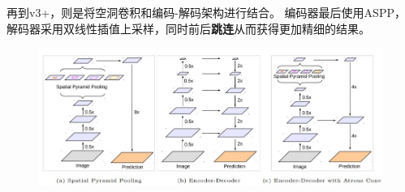 再到v3+\cite{chen:deeplabv3p_2018}，则是将空洞卷积和编码-解码架构进行结合。
编码器最后使用ASPP，解码器采用双线性插值上采样，同时前后\textbf{跳连}从而获得更加精细的结果。
\begin{figure}[H]
\centering
\includegraphics[width=\linewidth]{fig/deeplabv3+.jpg}
\end{figure}